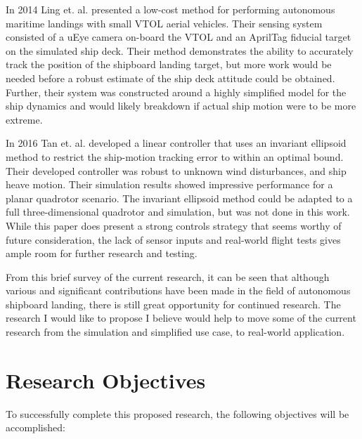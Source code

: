 \documentclass[12pt, letterpaper]{article}
\begin{document}
In 2014 Ling et. al. \cite{Ling2014} presented a low-cost method for performing autonomous maritime landings with small VTOL aerial vehicles.  Their sensing system consisted of a uEye camera on-board the VTOL and an AprilTag fiducial target on the simulated ship deck.  Their method demonstrates the ability to accurately track the position of the shipboard landing target, but more work would be needed before a robust estimate of the ship deck attitude could be obtained.  Further, their system was constructed around a highly simplified model for the ship dynamics and would likely breakdown if actual ship motion were to be more extreme.

In 2016 Tan et. al. \cite{Tan2016} developed a linear controller that uses an invariant ellipsoid method to restrict the ship-motion tracking error to within an optimal bound.  Their developed controller was robust to unknown wind disturbances, and ship heave motion.  Their simulation results showed impressive performance for a planar quadrotor scenario.  The invariant ellipsoid method could be adapted to a full three-dimensional quadrotor and simulation, but was not done in this work.  While this paper does present a strong controls strategy that seems worthy of future consideration, the lack of sensor inputs and real-world flight tests gives ample room for further research and testing.     


From this brief survey of the current research, it can be seen that although various and significant contributions have been made in the field of autonomous shipboard landing, there is still great opportunity for continued research.  The research I would like to propose I believe would help to move some of the current research from the simulation and simplified use case, to real-world application.

\section{Research Objectives}

To successfully complete this proposed research, the following objectives will be accomplished:
\end{document}
